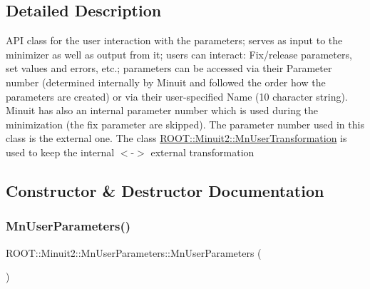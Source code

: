 \subsection{Detailed Description}
A\+PI class for the user interaction with the parameters; serves as input to the minimizer as well as output from it; users can interact\+: Fix/release parameters, set values and errors, etc.; parameters can be accessed via their Parameter number (determined internally by Minuit and followed the order how the parameters are created) or via their user-\/specified Name (10 character string). Minuit has also an internal parameter number which is used during the minimization (the fix parameter are skipped). The parameter number used in this class is the external one. The class \mbox{\hyperlink{classROOT_1_1Minuit2_1_1MnUserTransformation}{R\+O\+O\+T\+::\+Minuit2\+::\+Mn\+User\+Transformation}} is used to keep the internal $<$-\/$>$ external transformation 

\subsection{Constructor \& Destructor Documentation}
\mbox{\label{classROOT_1_1Minuit2_1_1MnUserParameters_afc09ce197c2e03a228cc9cafc3855371}} 
\subsubsection{\texorpdfstring{MnUserParameters()}{MnUserParameters()}\hspace{0.1cm}{\footnotesize\ttfamily [1/9]}}
{\footnotesize\ttfamily R\+O\+O\+T\+::\+Minuit2\+::\+Mn\+User\+Parameters\+::\+Mn\+User\+Parameters (\begin{DoxyParamCaption}{ }\end{DoxyParamCaption})\hspace{0.3cm}{\ttfamily [inline]}}

\mbox{\label{classROOT_1_1Minuit2_1_1MnUserParameters_a465242ec980354f799665ee8d2452d58}} 
